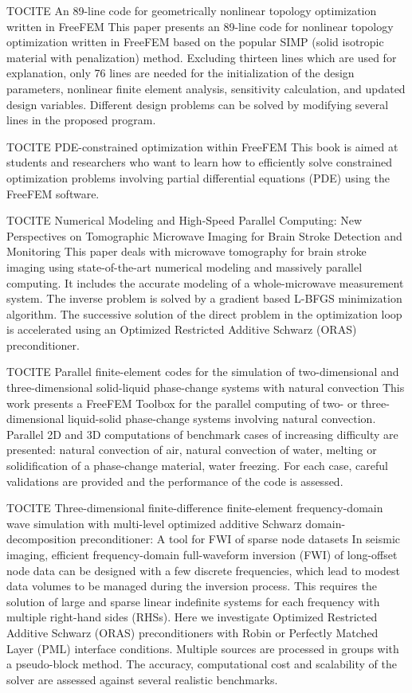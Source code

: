 \begin{description}
{TOCITE An 89-line code for geometrically nonlinear topology optimization written in FreeFEM} This paper presents an 89-line code for nonlinear topology optimization written in FreeFEM based on the popular SIMP (solid isotropic material with penalization) method. Excluding thirteen lines which are used for explanation, only 76 lines are needed for the initialization of the design parameters, nonlinear finite element analysis, sensitivity calculation, and updated design variables. Different design problems can be solved by modifying several lines in the proposed program.

{TOCITE PDE-constrained optimization within FreeFEM} This book is aimed at students and researchers who want to learn how to eﬃciently solve constrained optimization problems involving partial diﬀerential equations (PDE) using the FreeFEM software.

{TOCITE Numerical Modeling and High-Speed Parallel Computing: New Perspectives on Tomographic Microwave Imaging for Brain Stroke Detection and Monitoring} This paper deals with microwave tomography for brain stroke imaging using state-of-the-art numerical modeling and massively parallel computing. It includes the accurate modeling of a whole-microwave measurement system. The inverse problem is solved by a gradient based L-BFGS minimization algorithm. The successive solution of the direct problem in the optimization loop is accelerated using an Optimized Restricted Additive Schwarz (ORAS) preconditioner.

{TOCITE Parallel finite-element codes for the simulation of two-dimensional and three-dimensional solid-liquid phase-change systems with natural convection} This work presents a FreeFEM Toolbox for the parallel computing of two- or three-dimensional liquid-solid phase-change systems involving natural convection. Parallel 2D and 3D computations of benchmark cases of increasing difficulty are presented: natural convection of air, natural convection of water, melting or solidification of a phase-change material, water freezing. For each case, careful validations are provided and the performance of the code is assessed. 

{TOCITE Three-dimensional finite-difference finite-element frequency-domain wave simulation with multi-level optimized additive Schwarz domain-decomposition preconditioner: A tool for FWI of sparse node datasets} In seismic imaging, efficient frequency-domain full-waveform inversion (FWI) of long-offset node data can be designed with a few discrete frequencies, which lead to modest data volumes to be managed during the inversion process. This requires the solution of large and sparse linear indefinite systems for each frequency with multiple right-hand sides (RHSs). Here we investigate Optimized Restricted Additive Schwarz (ORAS) preconditioners with Robin or Perfectly Matched Layer (PML) interface conditions. Multiple sources are processed in groups with a pseudo-block method. The accuracy, computational cost and scalability of the solver are assessed against several realistic benchmarks.


\end{description}
